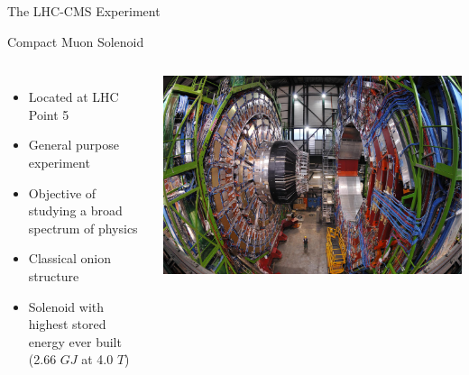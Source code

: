 \documentclass[8pt]{beamer}
\begin{document}
\begin{frame}{The LHC-CMS Experiment}
\begin{block}{Compact Muon Solenoid}
\begin{columns}
      \begin{itemize}
        \item Located at LHC Point 5
        \item General purpose experiment
        \item Objective of studying a broad spectrum of physics
        \item Classical onion structure
        \item Solenoid with highest stored energy ever built (2.66 $GJ$ at 4.0 $T$)
      \end{itemize}  

      \column[t]{4.5cm}
      \begin{center}
        \includegraphics[width=1.00\textwidth]{img/CMSOpen.jpg} 
      \end{center}

    \end{columns}

  \end{block}

\end{frame}
\end{document}
